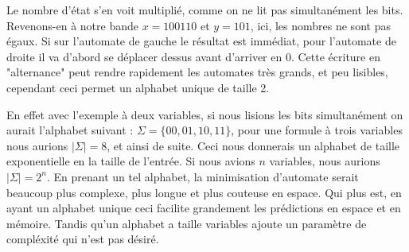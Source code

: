 Le nombre d'état s'en voit multiplié, comme on ne lit pas simultanément les bits. Revenons-en à notre bande $x = 100110$ et $y = 101$, ici, les nombres ne sont pas égaux. Si sur l'automate de gauche le résultat est immédiat, pour l'automate de droite il va d'abord se déplacer dessus avant d'arriver en 0. Cette écriture en "alternance" peut rendre rapidement les automates très grands, et peu lisibles, cependant ceci permet un alphabet unique de taille 2.\\\par

En effet avec l'exemple à deux variables, si nous lisions les bits simultanément on aurait l'alphabet suivant : $\Sigma = \{00, 01, 10, 11\}$, pour une formule à trois variables nous aurions $|\Sigma| = 8$, et ainsi de suite. Ceci nous donnerais un alphabet de taille exponentielle en la taille de l'entrée. Si nous avions $n$ variables, nous aurions $|\Sigma| = 2^n$. En prenant un tel alphabet, la minimisation d'automate serait beaucoup plus complexe, plus longue et plus couteuse en espace. Qui plus est, en ayant un alphabet unique ceci facilite grandement les prédictions en espace et en mémoire. Tandis qu'un alphabet a taille variables ajoute un paramètre de compléxité qui n'est pas désiré.
